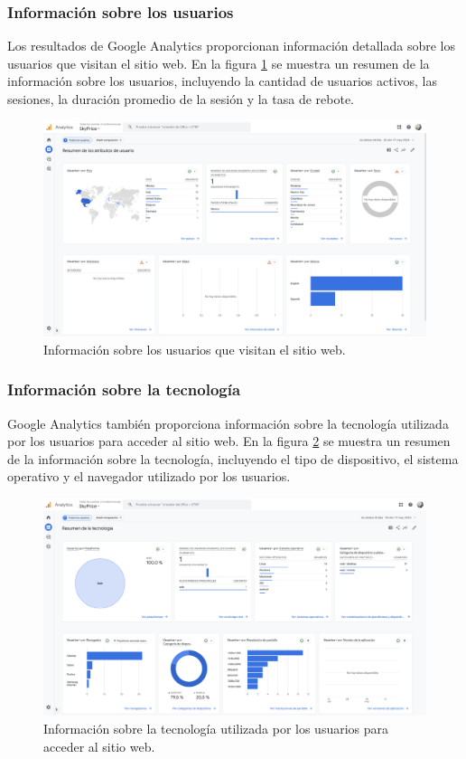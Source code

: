 \subsubsection{Información sobre los usuarios}
Los resultados de Google Analytics proporcionan información detallada sobre los
usuarios que visitan el sitio web. En la figura \ref{fig:google-analytics-usuarios}
se muestra un resumen de la información sobre los usuarios, incluyendo la cantidad
de usuarios activos, las sesiones, la duración promedio de la sesión y la tasa de rebote.

\begin{figure}[H]
    \centering
    \includegraphics[width=1.0\textwidth]{imagenes/05-implementacion/pruebas/analytics-users.png}
    \caption{Información sobre los usuarios que visitan el sitio web.}
    \label{fig:google-analytics-usuarios}
\end{figure}

\subsubsection{Información sobre la tecnología}
Google Analytics también proporciona información sobre la tecnología utilizada por
los usuarios para acceder al sitio web. En la figura \ref{fig:google-analytics-tecnologia}
se muestra un resumen de la información sobre la tecnología, incluyendo el tipo de
dispositivo, el sistema operativo y el navegador utilizado por los usuarios.

\begin{figure}[H]
    \centering
    \includegraphics[width=1.0\textwidth]{imagenes/05-implementacion/pruebas/analytics-tech.png}
    \caption{Información sobre la tecnología utilizada por los usuarios para acceder al sitio web.}
    \label{fig:google-analytics-tecnologia}
\end{figure}

